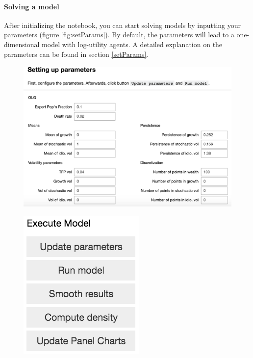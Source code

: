 \documentclass[12pt]{article}
\begin{document}
\paragraph{Solving a model} After initializing the notebook, you can start solving models by inputting your parameters (figure \ref{fig:setParams}). By default, the parameters will lead to a one-dimensional model with log-utility agents. A detailed explanation on the parameters can be found in section \ref{setParams}.

\begin{figure}[H]
\centering
\begin{minipage}{.5\textwidth}
  \centering
\includegraphics[scale=0.2]{settingParams}
  \label{fig:setParams}
\end{minipage}%
\begin{minipage}{.5\textwidth}
  \centering
\includegraphics[scale=0.5]{jupyterButtons}
  \label{fig:buttons}
\end{minipage}
\end{figure}
\end{document}
